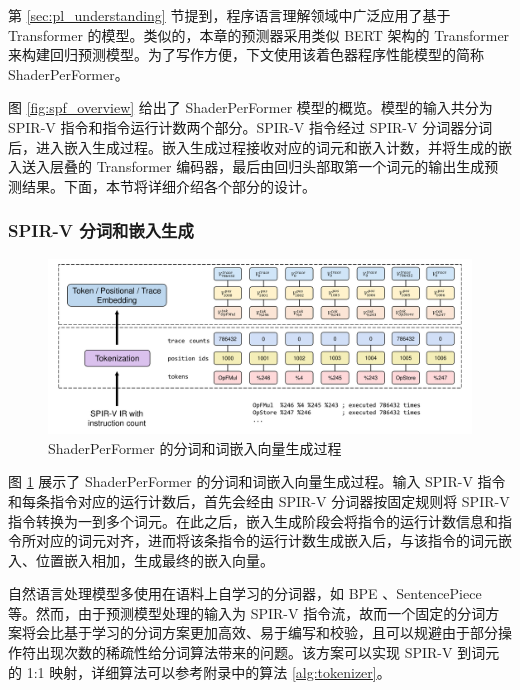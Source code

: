 第 \ref{sec:pl_understanding} 节提到，程序语言理解领域中广泛应用了基于 Transformer 的模型。类似的，{\amend 本章的}预测器采用类似 BERT\cite{devlin-etal-2019-bert} 架构的 Transformer 来构建回归预测模型。{\amend 为了写作方便，}下文使用该着色器程序性能模型的简称 ShaderPerFormer。

图 \ref{fig:spf_overview} 给出了 ShaderPerFormer 模型的概览。{\amend 模型的输入共分为 SPIR-V 指令和指令运行计数两个部分。SPIR-V 指令经过 SPIR-V 分词器分词后，进入嵌入生成过程。嵌入生成过程接收对应的词元和嵌入计数，并将生成的嵌入送入层叠的 Transformer 编码器，最后由回归头部取第一个词元的输出生成预测结果。下面，本节将详细介绍各个部分的设计。}

\subsubsection{SPIR-V 分词和嵌入生成}

\begin{figure}[h]
    \centering
    \includegraphics[width=1\linewidth]{figures/tokandembed.pdf}
    \caption{ShaderPerFormer 的分词和词嵌入向量生成过程}
    \label{fig:spf_embedding}
\end{figure}

图 \ref{fig:spf_embedding} 展示了 ShaderPerFormer 的分词和词嵌入向量生成过程。{\amend 输入 SPIR-V 指令和每条指令对应的运行计数后，首先会经由 SPIR-V 分词器按固定规则将 SPIR-V 指令转换为一到多个词元。在此之后，嵌入生成阶段会将指令的运行计数信息和指令所对应的词元对齐，进而将该条指令的运行计数生成嵌入后，与该指令的词元嵌入、位置嵌入相加，生成最终的嵌入向量。}

{} 自然语言处理模型多使用在语料上自学习的分词器，如 BPE \cite{sennrich-etal-2016-neural}、SentencePiece \cite{kudo-richardson-2018-sentencepiece} 等。然而，由于预测模型处理的输入为 SPIR-V 指令流，故而一个{\amend 固定的分词方案}将会比基于学习的分词方案更加高效、易于编写和校验，且可以规避由于部分操作符出现次数的稀疏性给分词算法带来的问题。该方案可以实现 SPIR-V 到词元的 1:1 映射，详细算法可以参考附录中的算法 \ref{alg:tokenizer}。

